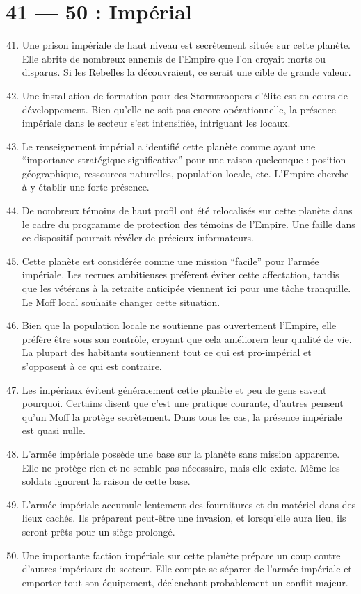 \documentclass{article}
\begin{document}
\section*{41 --- 50 : Impérial}
\begin{enumerate}
	\setcounter{enumi}{40}
	\item Une prison impériale de haut niveau est secrètement située sur cette planète. Elle abrite de nombreux ennemis de l’Empire que l’on croyait morts ou disparus. Si les Rebelles la découvraient, ce serait une cible de grande valeur.
	\item Une installation de formation pour des Stormtroopers d’élite est en cours de développement. Bien qu’elle ne soit pas encore opérationnelle, la présence impériale dans le secteur s’est intensifiée, intriguant les locaux.
	\item Le renseignement impérial a identifié cette planète comme ayant une “importance stratégique significative” pour une raison quelconque : position géographique, ressources naturelles, population locale, etc. L’Empire cherche à y établir une forte présence.
	\item De nombreux témoins de haut profil ont été relocalisés sur cette planète dans le cadre du programme de protection des témoins de l’Empire. Une faille dans ce dispositif pourrait révéler de précieux informateurs.
	\item Cette planète est considérée comme une mission “facile” pour l’armée impériale. Les recrues ambitieuses préfèrent éviter cette affectation, tandis que les vétérans à la retraite anticipée viennent ici pour une tâche tranquille. Le Moff local souhaite changer cette situation.
	\item Bien que la population locale ne soutienne pas ouvertement l’Empire, elle préfère être sous son contrôle, croyant que cela améliorera leur qualité de vie. La plupart des habitants soutiennent tout ce qui est pro-impérial et s’opposent à ce qui est contraire.
	\item Les impériaux évitent généralement cette planète et peu de gens savent pourquoi. Certains disent que c’est une pratique courante, d’autres pensent qu’un Moff la protège secrètement. Dans tous les cas, la présence impériale est quasi nulle.
	\item L’armée impériale possède une base sur la planète sans mission apparente. Elle ne protège rien et ne semble pas nécessaire, mais elle existe. Même les soldats ignorent la raison de cette base.
	\item L’armée impériale accumule lentement des fournitures et du matériel dans des lieux cachés. Ils préparent peut-être une invasion, et lorsqu’elle aura lieu, ils seront prêts pour un siège prolongé.
	\item Une importante faction impériale sur cette planète prépare un coup contre d’autres impériaux du secteur. Elle compte se séparer de l’armée impériale et emporter tout son équipement, déclenchant probablement un conflit majeur.
\end{enumerate}
\end{document}
